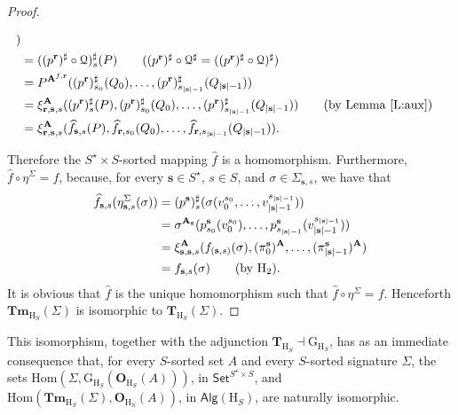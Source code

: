 \documentclass{amsart}
\newcommand{\bb}[1]{\ensuremath
	{\lvert #1 \rvert}}
\theoremstyle{plain}
\theoremstyle{definition}
\begin{document}
\begin{proof}
\begin{flushleft}
\begin{align*}
			) \\
			&=
			((p^{\mathbf{r}})^{\sharp}\circ \mathcal{Q})^{\sharp}_{s} (P)
			\tag{$(p^{\mathbf{r}})^{\sharp}\circ\mathcal{Q}^{\sharp} =
				((p^{\mathbf{r}})^{\sharp}\circ \mathcal{Q})^{\sharp}$}
			\\
			&=
			P^{\mathbf{A}^{f,\mathbf{r}}}
			((p^{\mathbf{r}})^{\sharp}_{s_{0}}(Q_{0}),\ldots,
			(p^{\mathbf{r}})^{\sharp}_{s_{\bb{\mathbf{s}}-1}}(Q_{\bb{\mathbf{s}}-1})
			) \\
			&=
			\xi_{\mathbf{r},\mathbf{s},s}^{\mathbf{A}}
			((p^{\mathbf{r}})^{\sharp}_{s}(P),
			(p^{\mathbf{r}})^{\sharp}_{s_{0}}(Q_{0}),\ldots,
			(p^{\mathbf{r}})^{\sharp}_{s_{\bb{\mathbf{s}}-1}}(Q_{\bb{\mathbf{s}}-1})
			)
			\tag{by Lemma~\ref{L:aux}}
			\\
			&=
			\xi_{\mathbf{r},\mathbf{s},s}^{\mathbf{A}}
			( \widehat{f}_{\mathbf{s},s}(P),
			\widehat{f}_{\mathbf{r},s_{0}}(Q_{0}),\ldots,
			\widehat{f}_{\mathbf{r},s_{\bb{\mathbf{s}}-1}}(Q_{\bb{\mathbf{s}}-1})
			).
		\end{align*}
	\end{flushleft}
	Therefore the $S^{\star}\times S$-sorted mapping $\widehat{f}$ is a homomorphism. Furthermore, $\widehat{f}\circ \eta^{\Sigma} = f$, because, for every $\mathbf{s}\in S^{\star}$, $s\in S$, and $\sigma\in \Sigma_{\mathbf{s},s}$, we have that%
	\begin{align*}
		\widehat{f}_{\mathbf{s},s}(\eta^{\Sigma}_{\mathbf{s},s}(\sigma)) &=
		(p^{\mathbf{s}})^{\sharp}_{s}(\sigma(v^{s_{0}}_{0},\ldots,v^{s_{\bb{\mathbf{s}}-1}}_{\bb{\mathbf{s}}-1}))
		\\&=
		\sigma^{\mathbf{A}_{\mathbf{s}}}
		(p^{\mathbf{s}}_{{s}_{0}}(v^{s_{0}}_{0}),
		\ldots,
		p^{\mathbf{s}}_{{s}_{\bb{\mathbf{s}}-1}}(v^{s_{\bb{\mathbf{s}}-1}}_{\bb{\mathbf{s}}-1})
		) \\
		&=
		\xi_{\mathbf{s},\mathbf{s},s}^{\mathbf{A}}
		( f_{(\mathbf{s},s)}(\sigma),
		(\pi^{\mathbf{s}}_{0})^{\mathbf{A}},
		\ldots,
		(\pi^{\mathbf{s}}_{\bb{\mathbf{s}}-1})^{\mathbf{A}}
		) \\
		&=
		f_{\mathbf{s},s}(\sigma) \tag{by $\mathrm{H}_{2}$}.
	\end{align*}
	It is obvious that $\widehat{f}$ is the unique homomorphism such that $\widehat{f}\circ \eta^{\Sigma} = f$.  Henceforth $\mathbf{Tm}_{\mathrm{H}_{S}}(\Sigma)$ is isomorphic to $\mathbf{T}_{\mathrm{H}_{S}}(\Sigma)$.
\end{proof}


This isomorphism, together with the adjunction $\mathbf{T}_{\mathrm{H}_{S}}\dashv\mathrm{G}_{\mathrm{H}_{S}}$,  has as an immediate consequence that, for every $S$-sorted set $A$ and every $S$-sorted signature $\Sigma$, the sets $\mathrm{Hom}({\Sigma},\mathrm{G}_{\mathrm{H}_{S}}(\mathbf{O}_{\mathrm{H}_{S}}(A)))$, in 
$\mathsf{Set}^{S^{\star}\times S}$, and $\mathrm{Hom}(\mathbf{Tm}_{\mathrm{H}_{S}}(\Sigma),\mathbf{O}_{\mathrm{H}_{S}}(A))$, in $\mathsf{Alg}(\mathrm{H}_{S})$, are naturally isomorphic.
\end{document}
